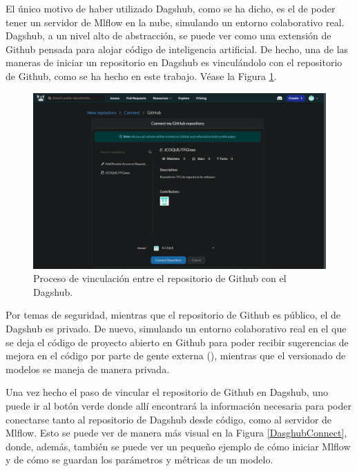 El único motivo de haber utilizado Dagshub, como se ha dicho, es el de poder tener un servidor de Mlflow en la nube, simulando un entorno colaborativo real. Dagshub, a un nivel alto de abstracción, se puede ver como una extensión de Github pensada para alojar código de inteligencia artificial. De hecho, una de las maneras de iniciar un repositorio en Dagshub es vinculándolo con el repositorio de Github, como se ha hecho en este trabajo. Véase la Figura \ref{dagshubInit}.

\begin{figure}[H]
    \centering
    \includegraphics[scale = 0.4]{imgs/dagshub.png}
    \caption[Proceso de vinculación entre el repositorio de Github con  el Dagshub.]{Proceso de vinculación entre el repositorio de Github con  el Dagshub\protect\fnm.}
    \label{dagshubInit}
\end{figure}



Por temas de seguridad, mientras que el repositorio de Github es público, el de Dagshub es privado. De nuevo, simulando un entorno colaborativo real en el que se deja el código de proyecto abierto en Github para poder recibir sugerencias de mejora en el código por parte de gente externa (), mientras que el versionado de modelos se maneja de manera privada.



Una vez hecho el paso de vincular el repositorio de Github en Dagshub, uno puede ir al botón verde  donde allí encontrará la información  necesaria para poder conectarse tanto al repositorio de Dagshub desde código, como al servidor de Mlflow. Esto se puede ver de manera más visual en la Figura \ref{DasghubConnect}, donde, además, también se puede ver un pequeño ejemplo de cómo iniciar Mlflow y de cómo se guardan los parámetros y métricas de un modelo.

